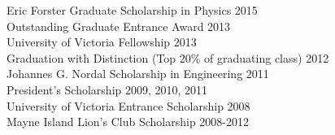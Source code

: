 \documentclass[margin,line]{resume}
\begin{document}
\begin{resume}
    Eric Forster Graduate Scholarship in Physics \hfill 2015\vspace{1mm}\\%
    Outstanding Graduate Entrance Award \hfill 2013\vspace{1mm}\\%
    University of Victoria Fellowship \hfill 2013\vspace{1mm}\\%
    Graduation with Distinction (Top 20\% of graduating class) \hfill 2012\vspace{1mm}\\%
    Johannes G. Nordal Scholarship in Engineering \hfill 2011\vspace{1mm}\\%
    President's Scholarship \hfill 2009, 2010, 2011\vspace{1mm}\\%
    University of Victoria Entrance Scholarship \hfill 2008\vspace{1mm}\\%
    Mayne Island Lion's Club Scholarship \hfill 2008-2012\vspace{1mm}\\%


\end{resume}
\end{document}
